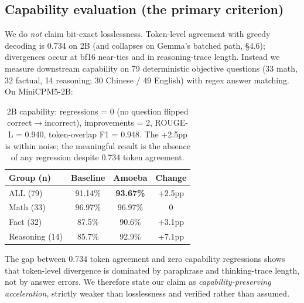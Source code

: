 \documentclass[11pt,a4paper]{article}
\begin{document}
\subsection{Capability evaluation (the primary criterion)}
\label{sec:capability}
We do \emph{not} claim bit-exact losslessness. Token-level agreement with greedy decoding is
0.734 on 2B (and collapses on Gemma's batched path, \S4.6); divergences occur at bf16 near-ties
and in reasoning-trace length. Instead we measure downstream capability on 79 deterministic
objective questions (33 math, 32 factual, 14 reasoning; 30 Chinese / 49 English) with regex
answer matching. On MiniCPM5-2B:

\begin{table}[h]
\centering
\begin{tabular}{lccc}
\toprule
Group (n) & Baseline & Amoeba & Change\\
\midrule
ALL (79) & 91.14\% & \textbf{93.67\%} & +2.5pp\\
Math (33) & 96.97\% & 96.97\% & 0\\
Fact (32) & 87.5\% & 90.6\% & +3.1pp\\
Reasoning (14) & 85.7\% & 92.9\% & +7.1pp\\
\bottomrule
\end{tabular}
\caption{2B capability: regressions = 0 (no question flipped correct$\to$incorrect),
improvements = 2, ROUGE-L = 0.940, token-overlap F1 = 0.948. The +2.5pp is within noise;
the meaningful result is the absence of any regression despite 0.734 token agreement.}
\end{table}
The gap between 0.734 token agreement and zero capability regressions shows that token-level
divergence is dominated by paraphrase and thinking-trace length, not by answer errors. We
therefore state our claim as \emph{capability-preserving acceleration}, strictly weaker than
losslessness and verified rather than assumed.
\end{document}
